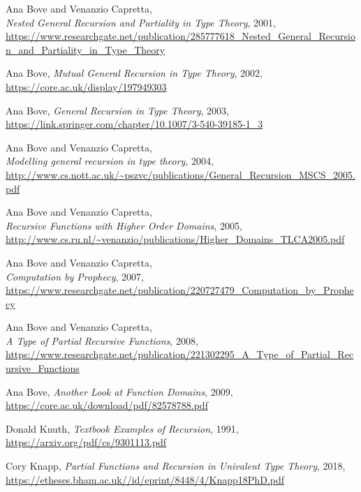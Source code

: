 \documentclass[declaration,mgr,english,shortabstract]{iithesis}
\begin{document}
\begin{thebibliography}{1}
    Ana Bove and Venanzio Capretta, \\
    \textit{Nested General Recursion and Partiality in Type Theory},
    2001, \\
    \url{https://www.researchgate.net/publication/285777618_Nested_General_Recursion_and_Partiality_in_Type_Theory}

    Ana Bove,
    \textit{Mutual General Recursion in Type Theory},
    2002, \\
    \url{https://core.ac.uk/display/197949303}

    Ana Bove,
    \textit{General Recursion in Type Theory},
    2003, \\
    \url{https://link.springer.com/chapter/10.1007/3-540-39185-1_3}

    Ana Bove and Venanzio Capretta, \\
    \textit{Modelling general recursion in type theory},
    2004, \\
    \url{http://www.cs.nott.ac.uk/~pszvc/publications/General_Recursion_MSCS_2005.pdf}

    Ana Bove and Venanzio Capretta, \\
    \textit{Recursive Functions with Higher Order Domains},
    2005, \\
    \url{http://www.cs.ru.nl/~venanzio/publications/Higher_Domains_TLCA2005.pdf}

    Ana Bove and Venanzio Capretta, \\
    \textit{Computation by Prophecy},
    2007, \\
    \url{https://www.researchgate.net/publication/220727479_Computation_by_Prophecy}

    Ana Bove and Venanzio Capretta, \\
    \textit{A Type of Partial Recursive Functions},
    2008, \\
    \url{https://www.researchgate.net/publication/221302295_A_Type_of_Partial_Recursive_Functions}

    Ana Bove,
    \textit{Another Look at Function Domains},
    2009, \\
    \url{https://core.ac.uk/download/pdf/82578788.pdf}

    Donald Knuth,
    \textit{Textbook Examples of Recursion},
    1991, \\
    \url{https://arxiv.org/pdf/cs/9301113.pdf}

    Cory Knapp,
    \textit{Partial Functions and Recursion in Univalent Type
    Theory},
    2018, \\
    \url{https://etheses.bham.ac.uk//id/eprint/8448/4/Knapp18PhD.pdf}
\end{thebibliography}
\end{document}

